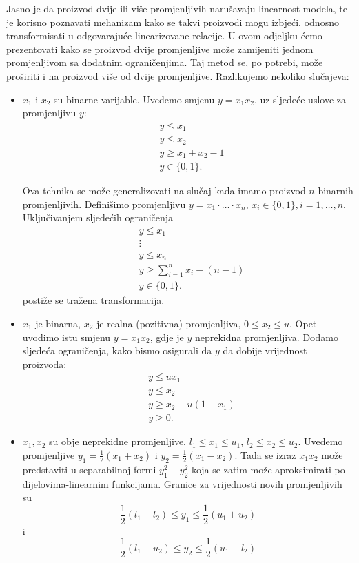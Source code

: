 \documentclass[a4paper, utf8, 11pt, colorlinks]{book}
\theoremstyle{definition}
\begin{document}
 Jasno je da proizvod dvije ili više promjenljivih narušavaju linearnost modela, te je korisno poznavati mehanizam kako se takvi proizvodi mogu izbjeći, odnosno transformisati u odgovarajuće linearizovane relacije. U ovom odjeljku ćemo prezentovati kako se proizvod dvije promjenljive može zamijeniti jednom promjenljivom  sa dodatnim ograničenjima. Taj metod se, po potrebi, može proširiti i na proizvod više od dvije promjenljive. Razlikujemo nekoliko slučajeva:
 \begin{itemize}
 	\item $x_1$ i $x_2$ su binarne varijable. Uvedemo smjenu $y=x_1 x_2$, uz sljedeće uslove za promjenljivu $y$:
 	  \begin{align*}
 		      &y \leq x_1 \\
 		      &y \leq x_2 \\
 		      & y \geq x_1 + x_2 - 1 \\
 		      & y \in \{0, 1\}.
 	  \end{align*}
   
 Ova tehnika se može generalizovati na slučaj kada imamo proizvod $n$ binarnih promjenljivih. Definišimo promjenljivu  $y = x_1 \cdot \ldots \cdot x_n$, $x_i\in\{0,1\}, i=1,\ldots ,n$. Uključivanjem sljedećih ograničenja 
   \begin{align*}
   	&y \leq x_1 \\
   	& \vdots \\
   	&y \leq x_n \\
   	& y \geq \sum_{i=1}^n x_i - (n-1) \\
   	& y \in \{0, 1\}.
   \end{align*}
postiže se tražena transformacija.

   \item $x_1$ je binarna, $x_2$ je realna (pozitivna) promjenljiva, $0 \leq x_2 \leq u$. Opet uvodimo istu smjenu $y= x_1 x_2$, gdje je $y$ neprekidna promjenljiva. Dodamo sljedeća ograničenja, kako bismo osigurali da $y$ da dobije vrijednost proizvoda:
    \begin{align*}
    	 &y \leq u x_1 \\
    	 &y \leq x_2 \\
    	 & y \geq x_2 - u(1-x_1) \\
    	 & y \geq 0.
    \end{align*}
 
  \item $x_1, x_2$ su obje neprekidne promjenljive, $l_1 \leq x_1 \leq u_1$, $l_2 \leq x_2 \leq u_2$. Uvedemo promjenljive $y_1 = \frac{1}{2}( x_1 + x_2) $ i  $y_2 =\frac{1}{2}(x_1 - x_2)$. Tada se izraz $x_1x_2$ može predstaviti u separabilnoj formi $y_1^2 - y_2^2$ koja se zatim može aproksimirati po-dijelovima-linearnim funkcijama. Granice za vrijednosti novih promjenljivih su 
  $$ \frac{1}{2}(l_1 + l_2) \leq y_1 \leq \frac{1}{2}(u_1 + u_2)$$ i 
  $$ \frac{1}{2}(l_1 - u_2) \leq y_2 \leq \frac{1}{2}(u_1 - l_2) $$
  
 \end{itemize} 
\end{document}
